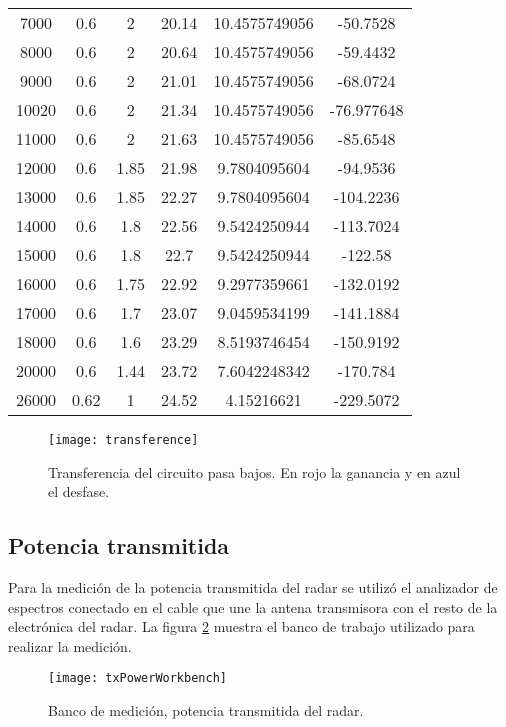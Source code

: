 \begin{table}[H]
\begin{tabular}{*{6}{S[table-number-alignment=center, table-figures-decimal=2, table-auto-round]}}
  7000 & 0.6 & 2 & 20.14 & 10.4575749056 & -50.7528 \tabularnewline

  8000 & 0.6 & 2 & 20.64 & 10.4575749056 & -59.4432 \tabularnewline

  9000 & 0.6 & 2 & 21.01 & 10.4575749056 & -68.0724 \tabularnewline

  10020 & 0.6 & 2 & 21.34 & 10.4575749056 & -76.977648 \tabularnewline

  11000 & 0.6 & 2 & 21.63 & 10.4575749056 & -85.6548 \tabularnewline

  12000 & 0.6 & 1.85 & 21.98 & 9.7804095604 & -94.9536 \tabularnewline

  13000 & 0.6 & 1.85 & 22.27 & 9.7804095604 & -104.2236 \tabularnewline

  14000 & 0.6 & 1.8 & 22.56 & 9.5424250944 & -113.7024 \tabularnewline

  15000 & 0.6 & 1.8 & 22.7 & 9.5424250944 & -122.58 \tabularnewline

  16000 & 0.6 & 1.75 & 22.92 & 9.2977359661 & -132.0192 \tabularnewline

  17000 & 0.6 & 1.7 & 23.07 & 9.0459534199 & -141.1884 \tabularnewline

  18000 & 0.6 & 1.6 & 23.29 & 8.5193746454 & -150.9192 \tabularnewline

  20000 & 0.6 & 1.44 & 23.72 & 7.6042248342 & -170.784 \tabularnewline

  26000 & 0.62 & 1 & 24.52 & 4.15216621 & -229.5072 \tabularnewline
  \bottomrule
  \end{tabular}
\end{table}

\begin{figure}[H]
 \centering
 \texttt{[image: transference]}
 \caption{Transferencia del circuito pasa bajos. En rojo la ganancia y en azul el desfase.}
 \label{fig:lowPassFilterTransference}
\end{figure}


\subsection{Potencia transmitida}

Para la medición de la potencia transmitida del radar se utilizó el analizador de espectros conectado en el cable que une la antena transmisora con el resto de la electrónica del radar. La figura \ref{fig:txPowerConnections} muestra el banco de trabajo utilizado para realizar la medición.

\begin{figure}[H]
 \centering
 \texttt{[image: txPowerWorkbench]}
 \caption{Banco de medición, potencia transmitida del radar.}
 \label{fig:txPowerConnections}
\end{figure}


